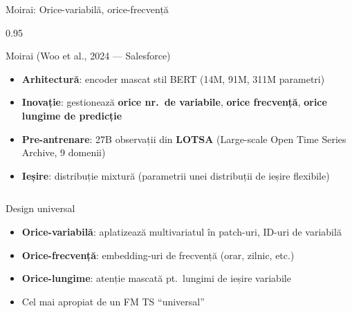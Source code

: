 \documentclass[9pt, aspectratio=169, t]{beamer}
\begin{document}
\begin{frame}{Moirai: Orice-variabilă, orice-frecvență}
    \begin{cminipage}{0.95\textwidth}
    \vspace{-3mm}
    {\scriptsize
    \begin{block}{Moirai (Woo et al., 2024 --- Salesforce)}
        \vspace{-1mm}
        \begin{itemize}\setlength{\itemsep}{0pt}
            \item \textbf{Arhitectură}: encoder mascat stil BERT (14M, 91M, 311M parametri)
            \item \textbf{Inovație}: gestionează \textbf{orice nr.\ de variabile}, \textbf{orice frecvență}, \textbf{orice lungime de predicție}
            \item \textbf{Pre-antrenare}: 27B observații din \textbf{LOTSA} (Large-scale Open Time Series Archive, 9 domenii)
            \item \textbf{Ieșire}: distribuție mixtură (parametrii unei distribuții de ieșire flexibile)
        \end{itemize}
        \vspace{-1mm}
    \end{block}
    \vspace{-3mm}
    \begin{columns}[T]
        \begin{exampleblock}{Design universal}
            \begin{itemize}\setlength{\itemsep}{0pt}
                \item \textbf{Orice-variabilă}: aplatizează multivariatul în patch-uri, ID-uri de variabilă
                \item \textbf{Orice-frecvență}: embedding-uri de frecvență (orar, zilnic, etc.)
                \item \textbf{Orice-lungime}: atenție mascată pt.\ lungimi de ieșire variabile
                \item Cel mai apropiat de un FM TS ``universal''
            \end{itemize}
        \end{exampleblock}


\end{columns}}
\end{cminipage}
\end{frame}
\end{document}
